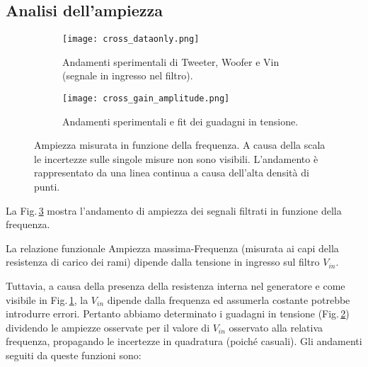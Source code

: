 \documentclass[../Relazione_circuiti]{subfiles}
\begin{document}
\fi

\subsection{Analisi dell'ampiezza}

  \begin{figure}[H]
    \centering

    \begin{subfigure}[t]{=0.49\textwidth}

      \texttt{[image: cross\_dataonly.png]}

      \caption{Andamenti sperimentali di Tweeter, Woofer e Vin (segnale in ingresso nel filtro).}
      \label{fig: amplitude_dataonly}

    \end{subfigure}
    \hfill
    \begin{subfigure}[t]{=0.49\textwidth}

      \texttt{[image: cross\_gain\_amplitude.png]}

      \caption
      {Andamenti sperimentali e fit dei guadagni in tensione.}
      \label{fig:cross_gain}
    \end{subfigure}

    \caption{
      Ampiezza misurata in funzione della frequenza.
      A causa della scala le incertezze sulle singole misure non sono visibili.
      L'andamento è rappresentato da una linea continua a causa dell'alta densità di punti.
    }

    \label{fig:cross_amplitude}

  \end{figure}

  La Fig.\,\ref{fig:cross_amplitude} mostra l'andamento di ampiezza dei segnali filtrati in funzione della frequenza.

  La relazione funzionale Ampiezza massima-Frequenza (misurata ai capi della resistenza di carico dei rami) dipende
  dalla tensione in ingresso sul filtro $V_{in}$.

  Tuttavia, a causa della presenza della resistenza interna nel generatore e come visibile in
  Fig.\,\ref{fig: amplitude_dataonly}, la $V_{in}$
  dipende dalla frequenza ed assumerla costante potrebbe introdurre errori.
  Pertanto abbiamo determinato i guadagni in tensione (Fig.\,\ref{fig:cross_gain}) dividendo le ampiezze osservate per
  il valore di $V_{in}$
  osservato alla relativa frequenza, propagando le incertezze in quadratura (poiché casuali).
  Gli andamenti seguiti da queste funzioni sono:
\end{document}
